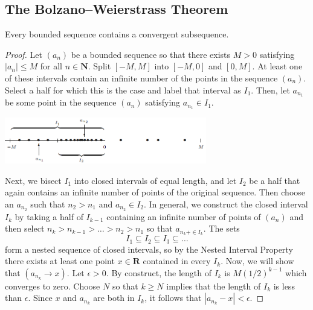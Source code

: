     \subsection*{The Bolzano–Weierstrass Theorem}
    \setcounter{theorem}{4}
    \begin{theorem}
        Every bounded sequence contains a convergent subsequence.
    \end{theorem}
    \begin{proof}
        Let $(a_n)$ be a bounded sequence so that there exists $M > 0$ satisfying $|a_n| \leq M$ for all $n \in \textbf{N}$. Split $[-M, M]$ into $[-M, 0]$ and $[0, M]$. At least one of these intervals contain an infinite number of the points in the sequence $(a_n)$. Select a half for which this is the case and label that interval as $I_1$. Then, let $a_{n_1}$ be some point in the sequence $(a_n)$ satisfying $a_{n_1} \in I_1$.
        \begin{center}
            \includegraphics[width=250pt]{bolzano.png}
        \end{center}
        Next, we bisect $I_1$ into closed intervals of equal length, and let $I_2$ be a half that again contains an infinite number of points of the original sequence. Then choose an $a_{n_2}$ such that $n_2 > n_1$ and $a_{n_2} \in I_2$. In general, we construct the closed interval $I_k$ by taking a half of $I_{k-1}$ containing an infinite number of points of $(a_n)$ and then select $n_k > n_{k-1} > \dots > n_2 > n_1$ so that $a_{n_k+ \in I_k}$. The sets 
        \begin{equation*}
            I_1 \subseteq I_2 \subseteq I_3 \subseteq \dots
        \end{equation*}
        form a nested sequence of closed intervals, so by the Nested Interval Property there exists at least one point $x \in \textbf{R}$ contained in every $I_k$. Now, we will show that $(a_{n_k} \rightarrow x)$.
        \newline \indent
        Let $\epsilon > 0$. By construct, the length of $I_k$ is $M(1/2)^{k - 1}$ which converges to zero. Choose $N$ so that $k \geq N$ implies that the length of $I_k$ is less than $\epsilon$. Since $x$ and $a_{n_k}$ are both in $I_k$, it follows that $|a_{n_k} - x| < \epsilon$.
    \end{proof}